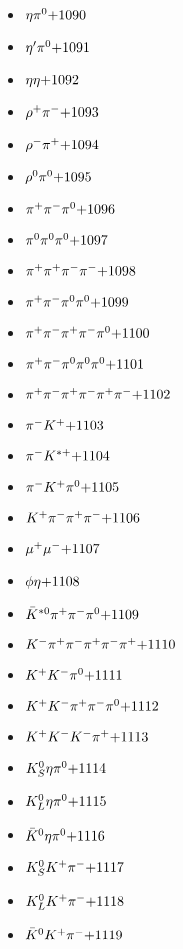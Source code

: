 \begin{multicols}{3}
\begin{itemize}
 \item $ \eta \pi^{0} \hfill{+1090}$
 \item $ {\eta^{\prime}} \pi^{0} \hfill{+1091}$
 \item $ \eta \eta \hfill{+1092}$
 \item $ \rho^{+} \pi^{-} \hfill{+1093}$
 \item $ \rho^{-} \pi^{+} \hfill{+1094}$
 \item $ \rho^{0} \pi^{0} \hfill{+1095}$
 \item $ \pi^{+} \pi^{-} \pi^{0} \hfill{+1096}$
 \item $ \pi^{0} \pi^{0} \pi^{0} \hfill{+1097}$
 \item $ \pi^{+} \pi^{+} \pi^{-} \pi^{-} \hfill{+1098}$
 \item $ \pi^{+} \pi^{-} \pi^{0} \pi^{0} \hfill{+1099}$
 \item $ \pi^{+} \pi^{-} \pi^{+} \pi^{-} \pi^{0} \hfill{+1100}$
 \item $ \pi^{+} \pi^{-} \pi^{0} \pi^{0} \pi^{0} \hfill{+1101}$
 \item $ \pi^{+} \pi^{-} \pi^{+} \pi^{-} \pi^{+} \pi^{-} \hfill{+1102}$
 \item $ \pi^{-} K^{+} \hfill{+1103}$
 \item $ \pi^{-} K^{*+} \hfill{+1104}$
 \item $ \pi^{-} K^{+} \pi^{0} \hfill{+1105}$
 \item $ K^{+} \pi^{-} \pi^{+} \pi^{-} \hfill{+1106}$
 \item $ \mu^{+} \mu^{-} \hfill{+1107}$
 \item $ \phi \eta \hfill{+1108}$
 \item $ \bar{K}^{*0} \pi^{+} \pi^{-} \pi^{0} \hfill{+1109}$
 \item $ K^{-} \pi^{+} \pi^{-} \pi^{+} \pi^{-} \pi^{+} \hfill{+1110}$
 \item $ K^{+} K^{-} \pi^{0} \hfill{+1111}$
 \item $ K^{+} K^{-} \pi^{+} \pi^{-} \pi^{0} \hfill{+1112}$
 \item $ K^{+} K^{-} K^{-} \pi^{+} \hfill{+1113}$
 \item $ K_{S}^{0} \eta \pi^{0} \hfill{+1114}$
 \item $ K_{L}^{0} \eta \pi^{0} \hfill{+1115}$
 \item $ \bar{K}^{0} \eta \pi^{0} \hfill{+1116}$
 \item $ K_{S}^{0} K^{+} \pi^{-} \hfill{+1117}$
 \item $ K_{L}^{0} K^{+} \pi^{-} \hfill{+1118}$
 \item $ \bar{K}^{0} K^{+} \pi^{-} \hfill{+1119}$

\end{itemize}
\end{multicols}
